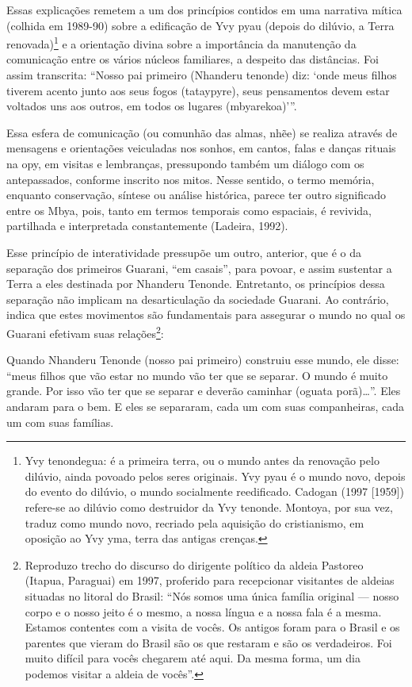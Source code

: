 Essas explicações remetem a um dos princípios contidos em uma narrativa
mítica (colhida em 1989-90) sobre a edificação de Yvy pyau (depois do
dilúvio, a Terra renovada)\footnote{Yvy tenondegua: é a primeira terra,
ou o mundo antes da renovação pelo dilúvio, ainda povoado pelos seres
originais. Yvy pyau é o mundo novo, depois do evento do dilúvio, o
mundo socialmente reedificado. Cadogan (1997 [1959]) refere-se ao
dilúvio como destruidor da Yvy tenonde. Montoya, por sua vez, traduz
como mundo novo, recriado pela aquisição do cristianismo, em oposição
ao Yvy yma, terra das antigas crenças. } e a orientação divina sobre a
importância da manutenção da comunicação entre os vários núcleos
familiares, a despeito das distâncias. Foi assim transcrita: ``Nosso pai
primeiro (Nhanderu tenonde) diz: ‘onde meus filhos tiverem acento junto
aos seus fogos (tataypyre), seus pensamentos devem estar voltados uns
aos outros, em todos os lugares (mbyarekoa)’''. 

Essa esfera de comunicação (ou comunhão das almas, nhẽe) se
realiza através de mensagens e orientações veiculadas nos sonhos, em
cantos, falas e danças rituais na opy, em visitas e lembranças,
pressupondo também um diálogo com os antepassados, conforme inscrito
nos mitos. Nesse sentido, o termo memória, enquanto conservação,
síntese ou análise histórica, parece ter outro significado entre os
Mbya, pois, tanto em termos temporais como espaciais, é revivida,
partilhada e interpretada constantemente (Ladeira, 1992).  

Esse princípio de interatividade pressupõe um outro, anterior, que é o
da separação dos primeiros Guarani, ``em casais'', para povoar, e assim
sustentar a Terra a eles destinada por Nhanderu Tenonde. Entretanto, os
princípios dessa separação não implicam na desarticulação da sociedade
Guarani. Ao contrário, indica que estes movimentos são fundamentais
para assegurar o mundo no qual os Guarani efetivam suas
relações\footnote{Reproduzo trecho do discurso do dirigente político da
aldeia Pastoreo (Itapua, Paraguai) em 1997, proferido para recepcionar
visitantes de aldeias situadas no litoral do Brasil: ``Nós somos uma
única família original — nosso corpo e o nosso jeito é o mesmo, a nossa
língua e a nossa fala é a mesma. Estamos contentes com a visita de
vocês. Os antigos foram para o Brasil e os parentes que vieram do
Brasil são os que restaram e são os verdadeiros. Foi muito difícil para
vocês chegarem até aqui. Da mesma forma, um dia podemos visitar a
aldeia de vocês''.}:

Quando Nhanderu Tenonde (nosso pai primeiro) construiu esse mundo, ele
disse: ``meus filhos que vão estar no mundo vão ter que se separar. O
mundo é muito grande. Por isso vão ter que se separar e deverão
caminhar (oguata porã)\ldots{}''. Eles andaram para o bem. E eles se
separaram, cada um com suas companheiras, cada um com suas famílias. 

